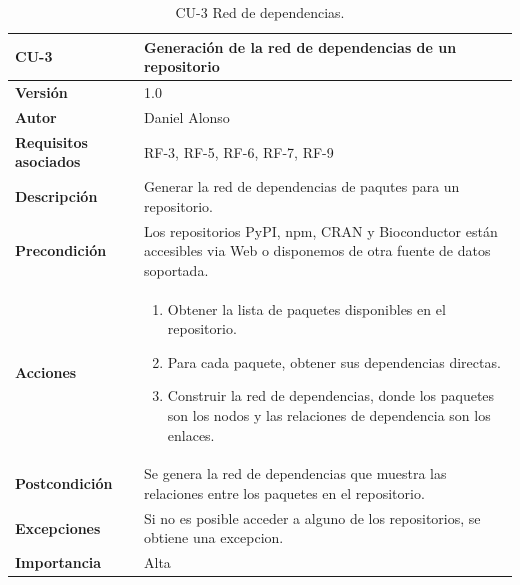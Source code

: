 \begin{table}[p]
	\centering
	\begin{tabularx}{\linewidth}{ p{} p{} }
		\toprule
		\textbf{CU-3}    & \textbf{Generación de la red de dependencias de un repositorio}\\
		\toprule
		\textbf{Versión}              & 1.0    \\
		\textbf{Autor}                & Daniel Alonso \\
		\textbf{Requisitos asociados} & RF-3, RF-5, RF-6, RF-7, RF-9 \\
		\textbf{Descripción}          & Generar la red de dependencias de paqutes para un repositorio. \\
		\textbf{Precondición}         & Los repositorios PyPI, npm, CRAN y Bioconductor están accesibles via Web o disponemos de otra fuente de datos soportada. \\
		\textbf{Acciones}             &
		\begin{enumerate}
			\def\labelenumi{\arabic{enumi}.}
			\tightlist
			\item Obtener la lista de paquetes disponibles en el repositorio.
			\item Para cada paquete, obtener sus dependencias directas.
			\item Construir la red de dependencias, donde los paquetes son los nodos y las relaciones de dependencia son los enlaces.
		\end{enumerate}\\
		\textbf{Postcondición}        & Se genera la red de dependencias que muestra las relaciones entre los paquetes en el repositorio. \\
		\textbf{Excepciones}          & Si no es posible acceder a alguno de los repositorios, se obtiene una excepcion.\\
		\textbf{Importancia}          & Alta\\
		\bottomrule
	\end{tabularx}
	\caption{CU-3 Red de dependencias.}
	\label{tab:cu3}
\end{table}


